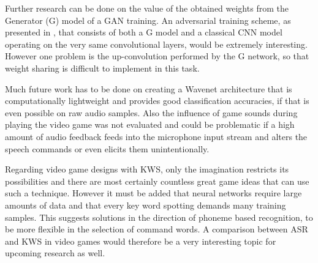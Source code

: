 Further research can be done on the value of the obtained weights from the Generator (G) model of a GAN training. 
An adversarial training scheme, as presented in \cite{Oezdenizci2020}, that consists of both a G model and a classical CNN model operating on the very same convolutional layers, would be extremely interesting. 
However one problem is the up-convolution performed by the G network, so that weight sharing is difficult to implement in this task.

Much future work has to be done on creating a Wavenet architecture that is computationally lightweight and provides good classification accuracies, if that is even possible on raw audio samples.
Also the influence of game sounds during playing the video game was not evaluated and could be problematic if a high amount of audio feedback feeds into the microphone input stream and alters the speech commands or even elicits them unintentionally.

Regarding video game designs with KWS, only the imagination restricts its possibilities and there are most certainly countless great game ideas that can use such a technique.
However it must be added that neural networks require large amounts of data and that every key word spotting demands many training samples.
This suggests solutions in the direction of phoneme based recognition, to be more flexible in the selection of command words.
A comparison between ASR and KWS in video games would therefore be a very interesting topic for upcoming research as well.